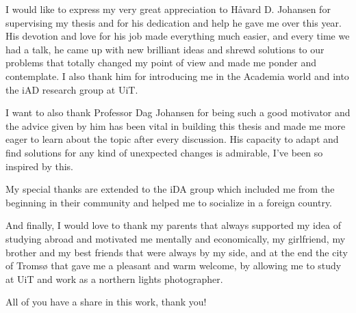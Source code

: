 \documentclass[USenglish]{uit-thesis}
\begin{document}
\begin{acknowledgement}
	I would like to express my very great
	appreciation to Håvard D.
	Johansen for supervising my thesis and
	for his dedication and help he gave me over
	this year. His devotion and love for his job
	made everything much easier, and every time
	we had a talk, he came up with new brilliant ideas
	and shrewd solutions to our problems that totally
	changed my point of view and made me ponder and
	contemplate. I also
	thank him for introducing me in the Academia
	world and into the iAD research group at UiT.
	
	I want to also thank Professor Dag Johansen
	for being such a good motivator and the
	advice given by him has been vital in building
	this thesis and made me more eager to learn
	about the topic after every discussion.
	His capacity to adapt and find solutions for any
	kind of unexpected changes is admirable,
	I’ve been so inspired by this.
	
	My special thanks are extended to the iDA group
	which included me from the beginning in their
	community and helped me to socialize in
	a foreign country.
	
	And finally, I would love to thank my parents
	that always supported my idea of studying
	abroad and motivated me mentally and economically,
	my girlfriend, my brother and my best friends
	that were always by my side, and at the end
	the city of Tromsø that gave me a pleasant
	and warm welcome, by allowing me to study
	at UiT and work as a northern lights photographer.
	
	All of you have a share in this work, thank you!
	
\end{acknowledgement}
\end{document}
